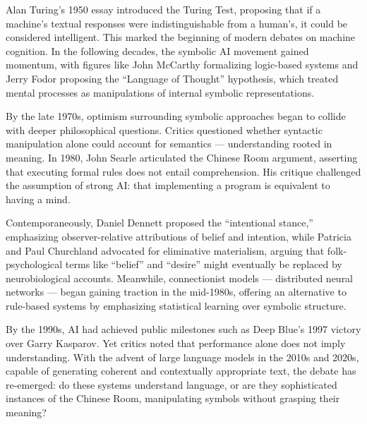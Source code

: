 \begin{historical}
Alan Turing’s 1950 essay introduced the Turing Test, proposing that if a machine’s textual responses were indistinguishable from a human’s, it could be considered intelligent. This marked the beginning of modern debates on machine cognition. In the following decades, the symbolic AI movement gained momentum, with figures like John McCarthy formalizing logic-based systems and Jerry Fodor proposing the “Language of Thought” hypothesis, which treated mental processes as manipulations of internal symbolic representations.

By the late 1970s, optimism surrounding symbolic approaches began to collide with deeper philosophical questions. Critics questioned whether syntactic manipulation alone could account for semantics — understanding rooted in meaning. In 1980, John Searle articulated the Chinese Room argument, asserting that executing formal rules does not entail comprehension. His critique challenged the assumption of strong AI: that implementing a program is equivalent to having a mind.

Contemporaneously, Daniel Dennett proposed the “intentional stance,” emphasizing observer-relative attributions of belief and intention, while Patricia and Paul Churchland advocated for eliminative materialism, arguing that folk-psychological terms like “belief” and “desire” might eventually be replaced by neurobiological accounts. Meanwhile, connectionist models — distributed neural networks — began gaining traction in the mid-1980s, offering an alternative to rule-based systems by emphasizing statistical learning over symbolic structure.

By the 1990s, AI had achieved public milestones such as Deep Blue’s 1997 victory over Garry Kasparov. Yet critics noted that performance alone does not imply understanding. With the advent of large language models in the 2010s and 2020s, capable of generating coherent and contextually appropriate text, the debate has re-emerged: do these systems understand language, or are they sophisticated instances of the Chinese Room, manipulating symbols without grasping their meaning?
\end{historical}
